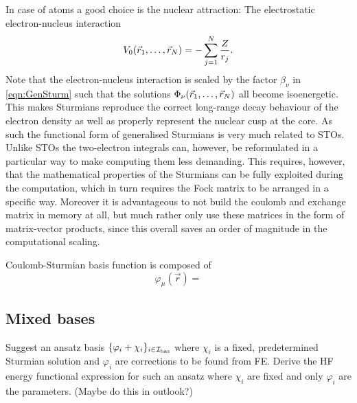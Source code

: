 In case of atoms a good choice is the nuclear attraction:
The electrostatic electron-nucleus interaction
\[
	V_0(\vec{r}_1, \ldots, \vec{r}_N) = - \sum_{j=1}^N \frac{Z}{r_j}.
\]
Note that the electron-nucleus interaction is scaled by the factor $\beta_\nu$ in \eqref{eqn:GenSturm}
such that the solutions $\Phi_\nu(\vec{r}_1, \ldots, \vec{r}_N)$ all become isoenergetic.
This makes Sturmians reproduce the correct long-range decay behaviour of the electron density
as well as properly represent the nuclear cusp at the core.
As such the functional form of generalised Sturmians is very much related to STOs.
Unlike STOs the two-electron integrals can, however, be reformulated in a particular way
to make computing them less demanding.
This requires, however, that the mathematical properties of the Sturmians
can be fully exploited during the computation,
which in turn requires the Fock matrix to be arranged in a specific way.
Moreover it is advantageous to not build the coulomb and exchange matrix in memory at all,
but much rather only use these matrices in the form of matrix-vector products,
since this overall saves an order of magnitude in the computational scaling.


Coulomb-Sturmian basis function is composed of
\[ \varphi_\mu(\vec{r}) = \]



\subsection{Mixed bases}
Suggest an ansatz basis $\{\varphi_i + \chi_i\}_{i\in\mathcal{I}_\text{bas}}$
where $\chi_i$ is a fixed, predetermined Sturmian solution
and $\varphi_i$ are corrections to be found from FE.
Derive the HF energy functional expression for such an ansatz
where $\chi_i$ are fixed and only $\varphi_i$ are the parameters.
(Maybe do this in outlook?)

